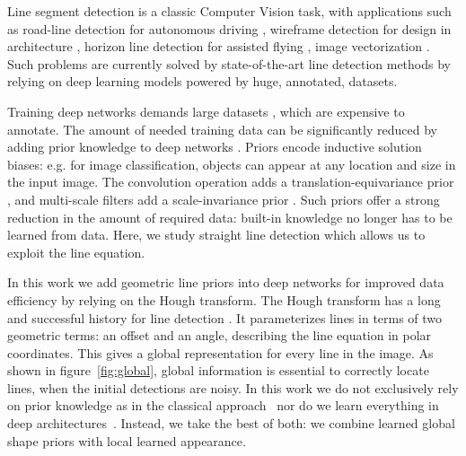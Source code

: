 \documentclass[runningheads]{llncs}
\begin{document}
Line segment detection is a classic Computer Vision task, with applications
such as road-line detection for autonomous driving \cite{hillel2014recent,lee2017vpgnet,niu2016robust,satzoda2014efficient}, wireframe detection for design in architecture \cite{huang2018learning,zhou2019end,zhou2019learning}, horizon line detection for assisted flying \cite{gershikov2013horizon,porzi2016deeply,simon2018contrario}, image vectorization \cite{sun2007image,zou2001cartoon}.
Such problems are currently solved by state-of-the-art line detection methods \cite{huang2018learning,zhou2019end,xue2019learning} by relying on deep learning models powered by huge, annotated, datasets.

Training deep networks demands large datasets \cite{barbu2019objectnet,ILSVRC15}, which are expensive to annotate. 
The amount of needed training data can be significantly reduced by adding prior knowledge to deep networks  \cite{bruna2013invariant,jacobsen2016structured,kayhan2020translation}.
Priors encode inductive solution biases: e.g. for image classification, objects can appear at any location and size in the input image. 
The convolution operation adds a translation-equivariance prior \cite{kayhan2020translation,urban2016deep}, and multi-scale filters add a scale-invariance prior \cite{shelhamer2019blurring,sosnovik2019scale}. Such priors offer a strong reduction in the amount of required data: built-in knowledge no longer has to be learned from data. Here, we study straight line detection which allows us to exploit the line equation. 

In this work we add geometric line priors into deep networks for improved data efficiency by relying on the Hough transform. 
The Hough transform has a long and successful history for line detection \cite{duda1972use,kamat1998complete,matas2000robust}.
It parameterizes lines in terms of two  geometric terms: an offset and an angle, describing the line equation in polar coordinates. 
This gives a global representation for every line in the image. 
As shown in figure~\ref{fig:global}, global information is essential to correctly locate lines, when the initial detections are noisy. In this work we do not exclusively rely on prior knowledge as in the classical approach~\cite{burns1986extracting,cho2017novel,puatruaucean2012parameterless,von2008lsd} nor do we learn everything in deep architectures~\cite{huang2018learning,xue2019learning,zhou2019end}. Instead, we take the best of both: we combine learned global shape priors with local learned appearance.
\end{document}
